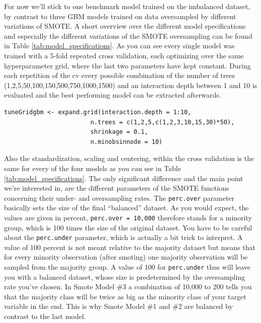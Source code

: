 \documentclass[12pt,a4paper]{article}
\begin{document}
For now we'll stick to one benchmark model trained on the imbalanced dataset, by contrast to three GBM models trained on data oversampled by different variations of SMOTE. A short overview over the different model specifications and especially the different variations of the SMOTE oversampling can be found in Table \vref{tab:model_specifications}. As you can see every single model was trained with a 5-fold repeated cross validation, each optimizing over the same hyperparameter grid, where the last two parameters have kept constant. During each repetition of the cv every possible combination of the number of trees (1,2,5,50,100,150,500,750,1000,1500) and an interaction depth between 1 and 10 is evaluated and the best performing model can be extracted afterwards.
\begin{verbatim}
tuneGridgbm <- expand.grid(interaction.depth = 1:10, 
                        n.trees = c(1,2,5,c(1,2,3,10,15,30)*50),
                        shrinkage = 0.1,
                        n.minobsinnode = 10) 
\end{verbatim}
Also the standardization, scaling and centering, within the cross validation is the same for every of the four models as you can see in Table \ref{tab:model_specifications}. The only significant difference and the main point we're interested in, are the different parameters of the SMOTE functions concerning their under- and oversampling rates. The \verb+perc.over+ parameter basically sets the size of the final \enquote{balanced} dataset. As you would expect, the values are given in percent, \verb+perc.over = 10,000+ therefore stands for a minority group, which is 100 times the size of the original dataset. You have to be careful about the \verb+perc.under+ parameter, which is actually a bit trick to interpret. A value of 100 percent is not meant relative to the majority dataset but means that for every minority observation (after smoting) one majority observation will be sampled from the majority group. A value of 100 for \verb+perc.under+ thus will leave you with a balanced dataset, whose size is predetermined by the oversampling rate you've chosen. In Smote Model \#3 a combination of 10,000 to 200 tells you that the majority class will be twice as big as the minority class of your target variable in the end. This is why Smote Model \#1 and \#2 are balanced by contrast to the last model.
\end{document}

